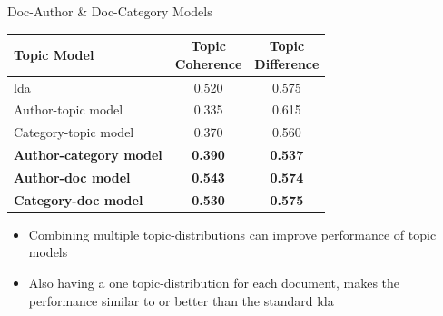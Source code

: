 \begin{frame}{\insertsection}{Doc-Author \& Doc-Category Models}
	\begin{table}
		\centering
		\begin{tabular}{l|c|c}
			Topic Model & \makecell{Topic \\ Coherence} & \makecell{Topic \\ Difference} \\
			\midrule
			\Acrlong{lda} & 0.520 & 0.575 \\
			Author-topic model & 0.335 & 0.615 \\
			Category-topic model & 0.370 & 0.560 \\
			\textbf{Author-category model} & \textbf{0.390} & \textbf{0.537} \\
			\textbf{Author-doc model} & \textbf{0.543} & \textbf{0.574} \\
			\textbf{Category-doc model} &\textbf{ 0.530} & \textbf{0.575} \\
		\end{tabular}
	\end{table}
	\begin{itemize}
		\item<2> Combining multiple topic-distributions can improve performance of topic models
		\item<3> Also having a one topic-distribution for each document, makes the performance similar to or better than the standard \gls{lda}
	\end{itemize}
\end{frame}

